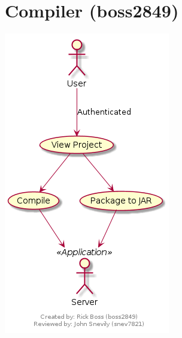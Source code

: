 \documentclass[11pt]{report}
\begin{document}
    \section{Compiler (boss2849)}
        \includegraphics[width=\textwidth]{diagrams/usecase-compiler}
    
    
    
    

\end{document}
